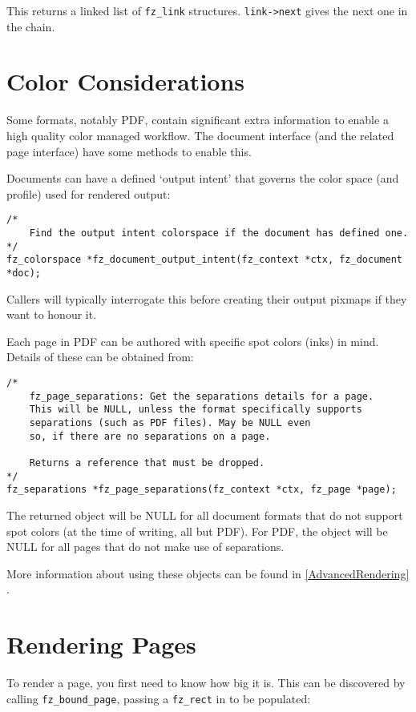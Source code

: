 \documentclass[oneside]{book}
\newcommand{\rjwref}[1] {\autoref{#1} \nameref{#1}}
\begin{document}
This returns a linked list of \texttt{fz\_link} structures. \texttt{link->next} gives the next one in the chain.

\section{Color Considerations}

Some formats, notably PDF, contain significant extra information to enable a high quality color managed workflow. The document interface (and the related page interface) have some methods to enable this.

Documents can have a defined `output intent' that governs the color space (and profile) used for rendered output:

\begin{lstlisting}
/*
	Find the output intent colorspace if the document has defined one.
*/
fz_colorspace *fz_document_output_intent(fz_context *ctx, fz_document *doc);
\end{lstlisting}

Callers will typically interrogate this before creating their output pixmaps if they want to honour it.

Each page in PDF can be authored with specific spot colors (inks) in mind. Details of these can be obtained from:

\begin{lstlisting}
/*
	fz_page_separations: Get the separations details for a page.
	This will be NULL, unless the format specifically supports
	separations (such as PDF files). May be NULL even
	so, if there are no separations on a page.

	Returns a reference that must be dropped.
*/
fz_separations *fz_page_separations(fz_context *ctx, fz_page *page);
\end{lstlisting}

The returned object will be NULL for all document formats that do not support spot colors (at the time of writing, all but PDF). For PDF, the object will be NULL for all pages that do not make use of separations.

More information about using these objects can be found in \rjwref{AdvancedRendering}.

\section{Rendering Pages}
\label{RenderingPages}

To render a page, you first need to know how big it is. This can be discovered by calling \texttt{fz\_bound\_page}, passing a \texttt{fz\_rect} in to be populated:
\end{document}
